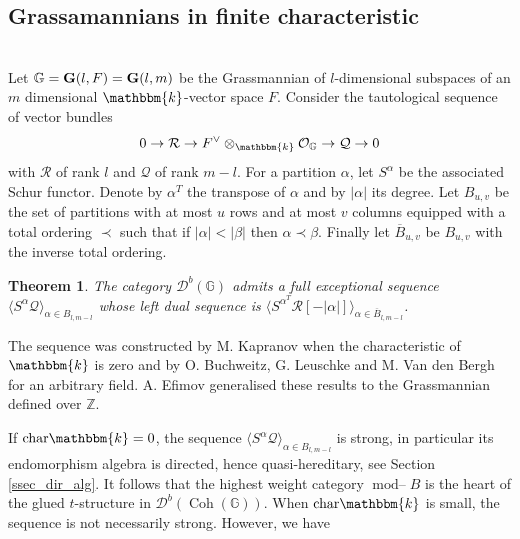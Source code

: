 \documentclass[12pt,a4paper]{amsart}
\newcommand{\dD}{{\mathcal{D}}}
\newcommand{\oO}{{\mathcal{O}}}
\newcommand{\qQ}{{\mathcal{Q}}}
\newcommand{\rR}{{\mathcal{R}}}
\newcommand{\kk}{\mathbbm{k}}
\newcommand{\tr}{{\mbox{$t$-struc}\-tu\-r}}
\newcommand{\Coh}{\mathop{\operatorname{Coh}}\nolimits}
\newcommand{\modu}{\mathop{\textrm{mod--}}}
\newcommand{\ol}[1]{\overline{#1}}
\newtheorem{THM}[LEM]{Theorem}
\theoremstyle{definition}
\begin{document}
\vspace{0.3cm}


\subsection{Grassamannians in finite characteristic}~\\
\label{secGrass}
Let $\mathbb{G} = {\bf G}(l,F) = {\bf G}(l,m)$ be the Grassmannian of $l$-dimensional subspaces of an $m$ dimensional $\kk$-vector space $F$. Consider the tautological sequence of vector bundles
\[
0 \to \rR \to F^{\vee} \otimes_{\kk} \oO_{\mathbb{G}} \to \qQ \to 0
\]
with $\rR$ of rank $l$ and $\qQ$ of rank $m-l$. For a partition $\alpha$, let $S^\alpha$ be the associated Schur functor. Denote by $\alpha^T$ the transpose of $\alpha$ and by $|\alpha|$ its degree. Let $B_{u,v}$ be the set of partitions with at most $u$ rows and at most $v$ columns equipped with a total ordering $\prec$ such that if $|\alpha|<|\beta|$ then $\alpha \prec \beta$. Finally let $\ol{B}_{u,v}$ be $B_{u,v}$ with the inverse total ordering.

\begin{THM}\cite{Kap1, BuchLeuVdB, Efi}
	The category $\dD^b(\mathbb{G})$ admits a full exceptional sequence $\langle S^\alpha \qQ \rangle_{\alpha \in B_{l,m-l}}$ whose left dual sequence is $\langle S^{\alpha^T} \rR[-|\alpha|] \rangle_{\alpha \in \ol{B}_{l,m-l}}$.
\end{THM}

The sequence was constructed by M. Kapranov \cite{Kap1} when the characteristic of $\kk$ is zero and by O. Buchweitz, G. Leuschke and M. Van den Bergh \cite{BuchLeuVdB} for an arbitrary field. A. Efimov \cite{Efi} generalised these results to the Grassmannian defined over $\mathbb{Z}$.

If ${\rm char}\kk =0$, the sequence $\langle S^\alpha \qQ \rangle_{\alpha \in B_{l,m-l}}$ is strong, in particular its endomorphism algebra is directed, hence quasi-hereditary, see Section \ref{ssec_dir_alg}. It follows that the highest weight category $\modu B$ is the heart of the glued \tr e in $\dD^b(\Coh(\mathbb{G}))$. When ${\rm char}\kk$ is small, the sequence is not necessarily strong. However, we have
\end{document}

